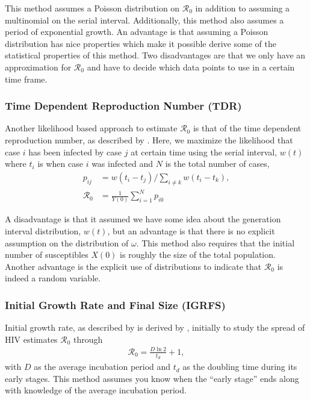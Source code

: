 \documentclass[12pt]{article}
\newcommand{\rr}{\ensuremath{\mathcal{R}_0}}
\begin{document}
This method assumes a Poisson distribution on $\rr$ in addition to assuming a multinomial on the serial interval.  Additionally, this method also assumes a period of exponential growth.  An advantage is that assuming a Poisson distribution has nice properties which make it possible derive some of the statistical properties of this method.  Two disadvantages are that we only have an approximation for $\rr$ and have to decide which data points to use in a certain time frame.



\subsubsection{Time Dependent Reproduction Number (TDR)}\label{sec:timedep}
Another likelihood based approach to estimate $\rr$ is that of the time dependent reproduction number, as described by \cite{forsberg2008}.  Here, we maximize the likelihood that case $i$ has been infected by case $j$ at certain time using the serial interval, $w(t)$ where $t_i$ is when case $i$ was infected and $N$ is the total number of cases,
\begin{align*}
  p_{ij} &= w(t_i- t_j) / \sum_{i \neq k} w(t_i - t_k),\\
  \rr &= \frac{1}{Y(0)}\sum_{i=1}^N p_{i0}
  \end{align*}

  A disadvantage is that it assumed we have some idea about the generation interval distribution, $w(t)$, but an advantage is that there is no explicit assumption on the distribution of $\omega$.  This method also requires that the initial number of susceptibles $X(0)$ is roughly the size of the total population.  Another advantage is the explicit use of distributions to indicate that $\rr$ is indeed a random variable.

\subsubsection{Initial Growth Rate and Final Size (IGRFS)}
\label{sec:igr-fs}

Initial growth rate, as described by \cite{dietz1993estimation} is derived by \cite{anderson1986}, initially to study the spread of HIV estimates $\rr$ through
\begin{align*}
\rr = \frac{D \ln 2} {t_d} + 1,
  \end{align*}
  with $D$ as the average incubation period and $t_d$ as the doubling time during its early stages.  This method assumes you know when the ``early stage'' ends along with knowledge of the average incubation period.  
\end{document}
